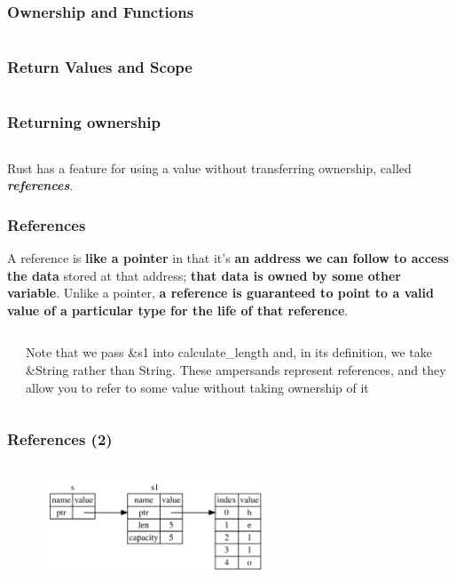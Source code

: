 \documentclass{beamer}
\begin{document}
\begin{frame}[fragile]
	\frametitle{Ownership and Functions}
	\inputminted[fontsize=\scriptsize]{rust}{./code/ownership-functions.rs}
\end{frame}

\begin{frame}[fragile]
	\frametitle{Return Values and Scope}
	\inputminted[fontsize=\scriptsize]{rust}{./code/ownership-return.rs}
\end{frame}

\begin{frame}[fragile]
	\frametitle{Returning ownership}
	\inputminted{rust}{./code/ownership-return2.rs}
	Rust has a feature for using a value without transferring ownership, called \textbf{\textit{references}}.
\end{frame}

\begin{frame}[fragile]
	\frametitle{References}
	A reference is\textbf{ like a pointer} in that it’s \textbf{an address we can follow to access the data} stored at that address; \textbf{that data is owned by some other variable}. Unlike a pointer,\textbf{ a reference is guaranteed to point to a valid value of a particular type for the life of that reference}.
	\begin{columns}
	\inputminted[fontsize=\scriptsize]{rust}{./code/references.rs}
		\small
	Note that we pass \&s1 into calculate\_length and, in its definition, we take \&String rather than String. These ampersands represent references, and they allow you to refer to some value without taking ownership of it
\end{columns}

\end{frame}

\begin{frame}[fragile]
	\frametitle{References (2)}
	\inputminted[fontsize=\scriptsize]{rust}{./code/references.rs}
		\begin{figure}
		\centering
		\includegraphics[width=0.6\textwidth]{./img/trpl04-05.png}
		\label{fig:figureRef}
	\end{figure}
\end{frame}
\end{document}
